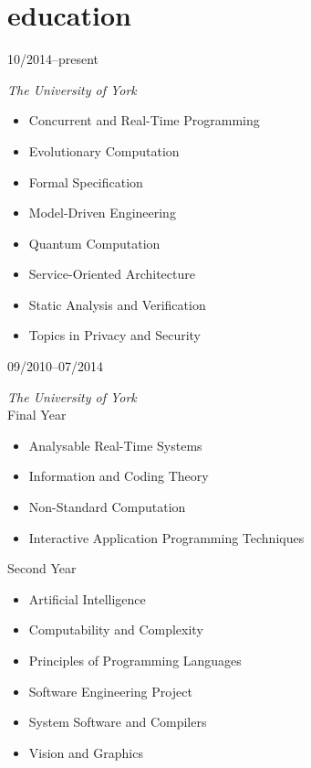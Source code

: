 \section{education}
\begin{entrylist}
{10/2014--present}
{
\emph{The University of York}\\
	\begin{minipage}[t]{\textwidth}
		\begin{itemize}[topsep=0pt]
			\item Concurrent and Real-Time Programming
			\item Evolutionary Computation
			\item Formal Specification
			\item Model-Driven Engineering
			\item Quantum Computation
			\item Service-Oriented Architecture
			\item Static Analysis and Verification
			\item Topics in Privacy and Security
		\end{itemize}
	\end{minipage}
}
{09/2010--07/2014}
{
\emph{The University of York}\\
	{Final Year}
	\begin{itemize}[topsep=0pt]
		\item Analysable Real-Time Systems
		\item Information and Coding Theory
		\item Non-Standard Computation
		\item Interactive Application Programming Techniques
	\end{itemize}

	{Second Year}
	\begin{itemize}[topsep=0pt]
		\item Artificial Intelligence
		\item Computability and Complexity
		\item Principles of Programming Languages
		\item Software Engineering Project
		\item System Software and Compilers
		\item Vision and Graphics
	\end{itemize}
	

}
\end{entrylist}
